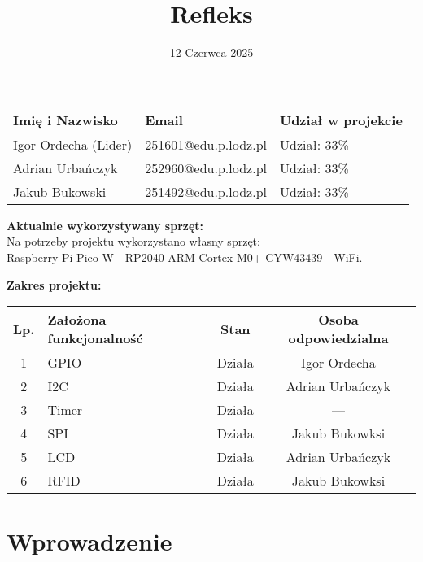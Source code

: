 \documentclass{article}
\title{Refleks}
\date{12 Czerwca 2025}
\begin{document}
\maketitle

\vspace{-2ex}

\begin{center}
\begin{tabular}{|p{4cm}|p{5cm}|p{4cm}|}
\hline
\textbf{Imię i Nazwisko} & \textbf{Email} & \textbf{Udział w projekcie} \\
\hline
Igor Ordecha (Lider) & 251601@edu.p.lodz.pl & Udział: 33\% \\
Adrian Urbańczyk & 252960@edu.p.lodz.pl & Udział: 33\% \\
Jakub Bukowski & 251492@edu.p.lodz.pl & Udział: 33\% \\
\hline
\end{tabular}
\end{center}

\vspace{2ex}

\noindent\textbf{Aktualnie wykorzystywany sprzęt:} \\
Na potrzeby projektu wykorzystano własny sprzęt: \\
Raspberry Pi Pico W - RP2040 ARM Cortex M0+ CYW43439 - WiFi.

\vspace{2ex}

\noindent\textbf{Zakres projektu:}

\begin{center}
\begin{tabular}{|c|p{5cm}|c|c|}
\hline
\textbf{Lp.} & \textbf{Założona funkcjonalność} & \textbf{Stan} & \textbf{Osoba odpowiedzialna} \\
\hline
1 & GPIO & Działa & Igor Ordecha \\
2 & I2C & Działa & Adrian Urbańczyk \\
3 & Timer & Działa & --- \\
4 & SPI & Działa & Jakub Bukowksi \\
5 & LCD & Działa & Adrian Urbańczyk \\
6 & RFID & Działa & Jakub Bukowksi \\
\hline
\end{tabular}
\end{center}

\vspace{2ex}


\section{Wprowadzenie}
\end{document}
